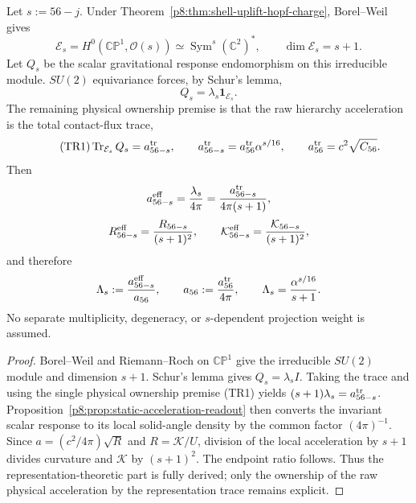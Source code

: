\documentclass[12pt,a4paper]{article}
\begin{document}
\begin{theorem}
\label{p8:lem:projected-contact-channel-splitting}
Let $s:=56-j$.  Under Theorem~\ref{p8:thm:shell-uplift-hopf-charge}, Borel--Weil gives
\begin{equation}
\label{p8:eq:Es-Borel-Weil}
\mathcal E_s=H^0(\mathbb{CP}^1,\mathcal O(s))
\simeq \operatorname{Sym}^s(\mathbb C^2)^*,
\qquad
\dim\mathcal E_s=s+1.
\end{equation}
Let $Q_s$ be the scalar gravitational response endomorphism on this irreducible module.  $SU(2)$ equivariance forces, by Schur's lemma,
\begin{equation}
\label{p8:eq:Schur-scalar-response-operator}
Q_s=\lambda_s\mathbf 1_{\mathcal E_s}.
\end{equation}
The remaining physical ownership premise is that the raw hierarchy acceleration is the total contact-flux trace,
\begin{equation}
\label{p8:eq:trace-normalization-raw-acceleration}
\tag{TR1}
\operatorname{Tr}_{\mathcal E_s}Q_s=a_{56-s}^{\rm tr},
\qquad
a_{56-s}^{\rm tr}=a_{56}^{\rm tr}\alpha^{s/16},
\qquad
a_{56}^{\rm tr}=c^2\sqrt{C_{56}}.
\end{equation}
Then
\begin{equation}
\label{p8:eq:projected-uplifted-acceleration}
a_{56-s}^{\rm eff}
=\frac{\lambda_s}{4\pi}
=\frac{a_{56-s}^{\rm tr}}{4\pi(s+1)},
\end{equation}
\begin{equation}
\label{p8:eq:projected-uplifted-curvature-K}
R_{56-s}^{\rm eff}=\frac{R_{56-s}}{(s+1)^2},
\qquad
\mathcal K_{56-s}^{\rm eff}=\frac{\mathcal K_{56-s}}{(s+1)^2},
\end{equation}
and therefore
\begin{equation}
\label{p8:eq:projected-Lambda-s}
\Lambda_s:=\frac{a_{56-s}^{\rm eff}}{a_{56}},
\qquad
a_{56}:=\frac{a_{56}^{\rm tr}}{4\pi},
\qquad
\Lambda_s=\frac{\alpha^{s/16}}{s+1}.
\end{equation}
No separate multiplicity, degeneracy, or $s$-dependent projection weight is assumed.
\end{theorem}

\begin{proof}
Borel--Weil and Riemann--Roch on $\mathbb{CP}^1$ give the irreducible $SU(2)$ module and dimension $s+1$.  Schur's lemma gives $Q_s=\lambda_s I$.  Taking the trace and using the single physical ownership premise (TR1) yields
$(s+1)\lambda_s=a_{56-s}^{\rm tr}$.  Proposition~\ref{p8:prop:static-acceleration-readout}
then converts the invariant scalar response to its local solid-angle density by
the common factor $(4\pi)^{-1}$.  Since $a=(c^2/4\pi)\sqrt R$ and
$R=\mathcal K/U$, division of the local acceleration by $s+1$ divides
curvature and $\mathcal K$ by $(s+1)^2$.  The endpoint ratio follows.  Thus the representation-theoretic part is fully derived; only the ownership of the raw physical acceleration by the representation trace remains explicit.
\end{proof}
\end{document}
